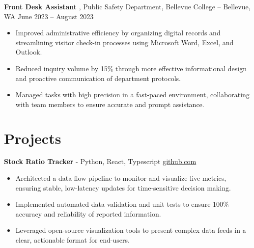 \documentclass[11pt]{article}       %
\begin{document}
\textbf{Front Desk Assistant} {, Public Safety Department, Bellevue College} -- Bellevue, WA \hfill June 2023 -- August 2023 \\
\vspace{-9pt}
\begin{itemize}
  \item Improved administrative efficiency by organizing digital records and streamlining visitor check-in processes using Microsoft Word, Excel, and Outlook.
  \item Reduced inquiry volume by 15\% through more effective informational design and proactive communication of department protocols.
  \item Managed tasks with high precision in a fast-paced environment, collaborating with team members to ensure accurate and prompt assistance.
\end{itemize}

\vspace{-18.5pt}

\section*{Projects}

\textbf{Stock Ratio Tracker}{ - Python, React, Typescript} \hfill \href{https://github.com/Monica20030707/tradingDashboard-UI}{github.com} \\
\vspace{-9pt}
\begin{itemize}
  \item Architected a data-flow pipeline to monitor and visualize live metrics, ensuring stable, low-latency updates for time-sensitive decision making. 
  \item Implemented automated data validation and unit tests to ensure 100\% accuracy and reliability of reported information.
  \item Leveraged open-source visualization tools to present complex data feeds in a clear, actionable format for end-users.
\end{itemize}

\end{document}
